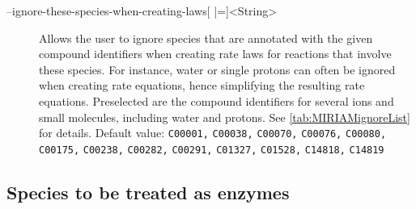 \begin{description}
\item[--ignore-these-species-when-creating-laws{[} |={]}<String>]
  Allows the user to ignore species that are annotated with the
  given compound identifiers when creating rate laws for reactions
  that involve these species. For instance, water or single protons
  can often be ignored when creating rate equations, hence simplifying
  the resulting rate equations. Preselected are the \KEGG compound
  identifiers for several ions and small molecules, including water and
  protons. See \vref{tab:MIRIAMignoreList} for details.
  Default value: \texttt{C00001,} \texttt{C00038,} \texttt{C00070,}
  \texttt{C00076,} \texttt{C00080,} \texttt{C00175,} \texttt{C00238,}
  \texttt{C00282,} \texttt{C00291,} \texttt{C01327,} \texttt{C01528,}
  \texttt{C14818,} \texttt{C14819}
\end{description}

\subsection{Species to be treated as enzymes}

